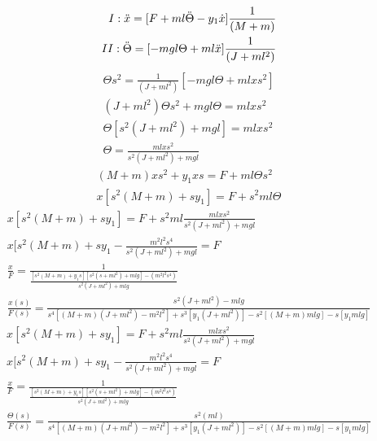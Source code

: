 \begin{align}\label{eq: 1}
        \RN{1}:\ddot{x} = [F+ml\ddot{\Theta}-y_{1}\dot{x}] \frac{1}{(M+m)}\\
        \RN{2}:\ddot{\Theta} = [-mgl\Theta+ml\ddot{x}] \frac{1}{(J+ml^2)} 
    \end{align}
\begin{align}\label{eq: 2}
        \Theta s^2=\frac{1}{(J+ml^2)}[-mgl\Theta+mlxs^2]\\
        (J+ml^2)\Theta s^2+mgl\Theta=mlxs^2\\
        \Theta[s^2(J+ml^2)+mgl]=mlxs^2\\
        \Theta=\frac{mlxs^2}{s^2(J+ml^2)+mgl}
    \end{align}
\begin{align}\label{eq: 3}
            (M+m)xs^2+y_{1}xs=F+ml\Theta s^2\\
        x[s^2(M+m)+sy_{1}]=F+s^2ml\Theta
    \end{align}
\begin{align}\label{eq: 4}
        x[s^2(M+m)+sy_{1}]=F+s^2ml\frac{mlxs^2}{s^2(J+ml^2)+mgl}\\
        x[s^2(M+m)+sy_{1}-\frac{m^2l^2s^4}{s^2(J+ml^2)+mgl}=F\\
        \frac{x}{F}=\frac{1}{\frac{[s^2(M+m)+y_{1}s][s^2(s+ml^2)+mlg]-(m^2l^2s^4)}{s^2(J+ml^2)+mlg}}\\
        \frac{x(s)}{F(s)}=\frac{s^2(J+ml^2)-mlg}{s^4[(M+m)(J+ml^2)-m^2l^2]+s^3[y_{1}(J+ml^2)]-s^2[(M+m)mlg]-s[y_{1}mlg]}
    \end{align}
\begin{align}\label{eq: 5}
        x[s^2(M+m)+sy_{1}]=F+s^2ml\frac{mlxs^2}{s^2(J+ml^2)+mgl}\\
        x[s^2(M+m)+sy_{1}-\frac{m^2l^2s^4}{s^2(J+ml^2)+mgl}=F\\
        \frac{x}{F}=\frac{1}{\frac{[s^2(M+m)+y_{1}s][s^2(s+ml^2)+mlg]-(m^2l^2s^4)}{s^2(J+ml^2)+mlg}}\\
        \frac{\Theta(s)}{F(s)}=\frac{s^2(ml)}{s^4[(M+m)(J+ml^2)-m^2l^2]+s^3[y_{1}(J+ml^2)]-s^2[(M+m)mlg]-s[y_{1}mlg]}
    \end{align}